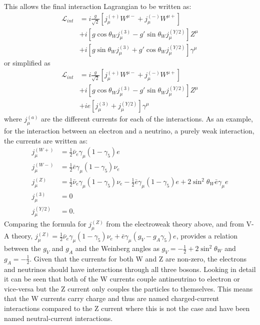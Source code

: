 This allows the final interaction Lagrangian to be written as:
\begin{align}
\mathcal{L}_{int}&=i\frac{g}{\sqrt{2}}[j_\mu^{(+)}W^{\mu-}+j_\mu^{(-)}W^{\mu+}]\\ \nonumber
&+i[g\cos\theta_Wj_\mu^{(3)}-g'\sin\theta_Wj_\mu^{(Y/2)}]Z^\mu\\ \nonumber
&+i[g\sin\theta_Wj_\mu^{(3)}+g'\cos\theta_Wj_\mu^{(Y/2)}]\gamma^\mu
\end{align}
or simplified as 
\begin{align}
\mathcal{L}_{int}&=i\frac{g}{\sqrt{2}}[j_\mu^{(+)}W^{\mu-}+j_\mu^{(-)}W^{\mu+}]\\ \nonumber
&+i[g\cos\theta_Wj_\mu^{(3)}-g'\sin\theta_Wj_\mu^{(Y/2)}]Z^\mu\\ \nonumber
&+ie[j_\mu^{(3)}+j_\mu^{(Y/2)}]\gamma^\mu
\end{align}
where $j_{\mu}^{(a)}$ are the different currents for each of the interactions. As an example, for the interaction between an electron and a neutrino, a purely weak interaction, the currents are written as:
\begin{align}
j_\mu^{(W+)}&=\frac{1}{2}\bar{\nu}_e\gamma_\mu(1-\gamma_5)e\\
j_\mu^{(W-)}&=\frac{1}{2}\bar{e}\gamma_\mu(1-\gamma_5)\nu_e\\
j_\mu^{(Z)}&=\frac{1}{2}\bar{\nu}_e\gamma_\mu(1-\gamma_5)\nu_e-\frac{1}{2}\bar{e}\gamma_\mu(1-\gamma_5)e+2\sin^2\theta_W\bar{e}\gamma_\mu e\\
j_\mu^{(3)}&=0\\
j_\mu^{(Y/2)}&=0.
\end{align}
Comparing the formula for $j_\mu^{(Z)}$ from the electroweak theory above, and from V-A theory, $j_\mu^{(Z)}=\frac{1}{2}\bar{\nu}_e\gamma_\mu(1-\gamma_5)\nu_e+\bar{e}\gamma_\mu(g_V-g_A\gamma_5)e$, provides a relation between the $g_V$ and $g_A$ and the Weinberg angles as $g_V=-\frac{1}{2}+2\sin^2\theta_W$ and $g_A = -\frac{1}{2}$. Given that the currents for both W and Z are non-zero, the electrons and neutrinos should have interactions through all three bosons. Looking in detail it can be seen that both of the W currents couple antineutrino to electron or vice-versa but the Z current only couples the particles to themselves. This means that the W currents carry charge and thus are named charged-current interactions compared to the Z current where this is not the case and have been named neutral-current interactions.


